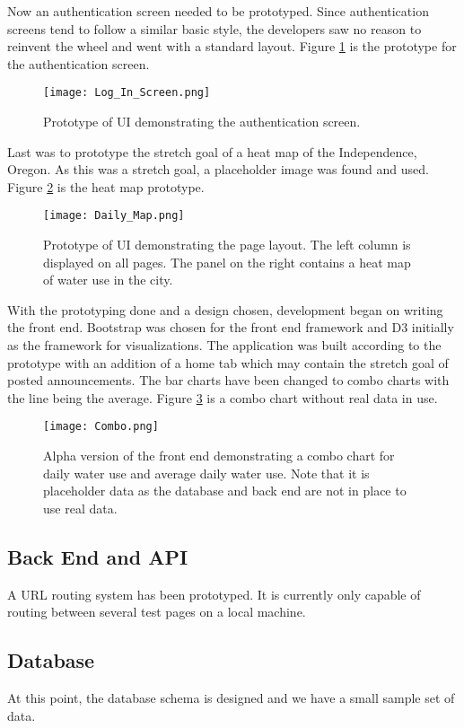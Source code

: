 \documentclass[journal]{IEEEtran}
\begin{document}
Now an authentication screen needed to be prototyped. Since authentication screens tend to follow a similar basic style, the developers saw no reason to reinvent the wheel and went with a standard layout. Figure \ref{fig:logon} is the prototype for the authentication screen.

\begin{figure}[H]
  \texttt{[image: Log\_In\_Screen.png]}
  \caption{Prototype of UI demonstrating the authentication screen.}
  \label{fig:logon}
\end{figure}

Last was to prototype the stretch goal of a heat map of the Independence, Oregon. As this was a stretch goal, a placeholder image was found and used. Figure \ref{fig:heatmap} is the heat map prototype.

\begin{figure}[H]
  \texttt{[image: Daily\_Map.png]}
  \caption{Prototype of UI demonstrating the page layout. The left column is displayed on all pages. The panel on the right contains a heat map of water use in the city.}
  \label{fig:heatmap}
\end{figure}

With the prototyping done and a design chosen, development began on writing the front end. Bootstrap was chosen for the front end framework and D3 initially as the framework for visualizations. The application was built according to the prototype with an addition of a home tab which may contain the stretch goal of posted announcements. The bar charts have been changed to combo charts with the line being the average. Figure \ref{fig:combo} is a combo chart without real data in use.

\begin{figure}[H]
  \texttt{[image: Combo.png]}
  \caption{Alpha version of the front end demonstrating a combo chart for daily water use and average daily water use. Note that it is placeholder data as the database and back end are not in place to use real data.}
  \label{fig:combo}
\end{figure}

\subsection{Back End and API}
A URL routing system has been prototyped. It is currently only capable of routing between several test pages on a local machine.
 	
\subsection{Database}
At this point, the database schema is designed and we have a small sample set of data. 
\end{document}

